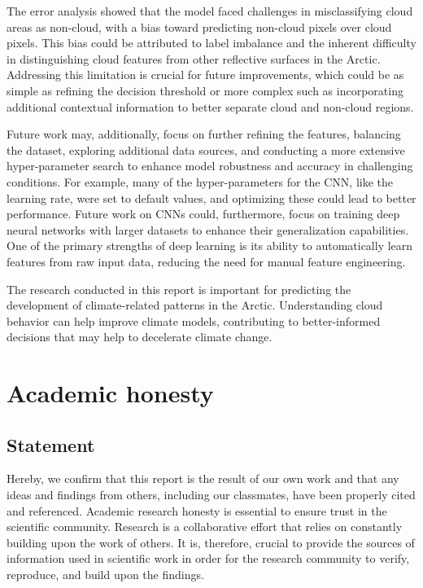 \documentclass[11pt,letterpaper]{article}
\begin{document}
The error analysis showed that the model faced challenges in misclassifying cloud areas as non-cloud, with a bias toward predicting non-cloud pixels over cloud pixels. This bias could be attributed to label imbalance and the inherent difficulty in distinguishing cloud features from other reflective surfaces in the Arctic. Addressing this limitation is crucial for future improvements, which could be as simple as refining the decision threshold or more complex such as incorporating additional contextual information to better separate cloud and non-cloud regions.

Future work may, additionally, focus on further refining the features, balancing the dataset, exploring additional data sources, and conducting a more extensive hyper-parameter search to enhance model robustness and accuracy in challenging conditions. For example, many of the hyper-parameters for the CNN, like the learning rate, were set to default values, and optimizing these could lead to better performance. Future work on CNNs could, furthermore, focus on training deep neural networks with larger datasets to enhance their generalization capabilities. One of the primary strengths of deep learning is its ability to automatically learn features from raw input data, reducing the need for manual feature engineering.

The research conducted in this report is important for predicting the development of climate-related patterns in the Arctic. Understanding cloud behavior can help improve climate models, contributing to better-informed decisions that may help to decelerate climate change.

\newpage
\printbibliography

\appendix
\section{Academic honesty}
\subsection{Statement}
Hereby, we confirm that this report is the result of our own work and that any ideas and findings from others, including our classmates, have been properly cited and referenced. Academic research honesty is essential to ensure trust in the scientific community. Research is a collaborative effort that relies on constantly building upon the work of others. It is, therefore, crucial to provide the sources of information used in scientific work in order for the research community to verify, reproduce, and build upon the findings.
\end{document}
